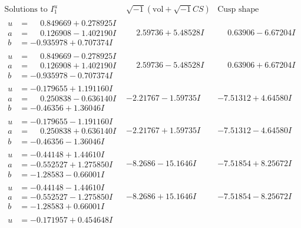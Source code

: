 \documentclass[1p]{elsarticle_modified}
\theoremstyle{definition}
\newcommand{\I}{\sqrt{-1}}
\begin{document}
$$\begin{array}{c|c|c}  
\text{Solutions to }I^u_{1}& \I (\text{vol} + \sqrt{-1}CS) & \text{Cusp shape}\\
 \hline 
\begin{aligned}
u &= \phantom{-}0.849669 + 0.278925 I \\
a &= \phantom{-}0.126908 - 1.402190 I \\
b &= -0.935978 + 0.707374 I\end{aligned}
 & \phantom{-}2.59736 + 5.48528 I & \phantom{-}0.63906 - 6.67204 I \\ \hline\begin{aligned}
u &= \phantom{-}0.849669 - 0.278925 I \\
a &= \phantom{-}0.126908 + 1.402190 I \\
b &= -0.935978 - 0.707374 I\end{aligned}
 & \phantom{-}2.59736 - 5.48528 I & \phantom{-}0.63906 + 6.67204 I \\ \hline\begin{aligned}
u &= -0.179655 + 1.191160 I \\
a &= \phantom{-}0.250838 - 0.636140 I \\
b &= -0.46356 + 1.36046 I\end{aligned}
 & -2.21767 - 1.59735 I & -7.51312 + 4.64580 I \\ \hline\begin{aligned}
u &= -0.179655 - 1.191160 I \\
a &= \phantom{-}0.250838 + 0.636140 I \\
b &= -0.46356 - 1.36046 I\end{aligned}
 & -2.21767 + 1.59735 I & -7.51312 - 4.64580 I \\ \hline\begin{aligned}
u &= -0.44148 + 1.44610 I \\
a &= -0.552527 + 1.275850 I \\
b &= -1.28583 - 0.66001 I\end{aligned}
 & -8.2686 - 15.1646 I & -7.51854 + 8.25672 I \\ \hline\begin{aligned}
u &= -0.44148 - 1.44610 I \\
a &= -0.552527 - 1.275850 I \\
b &= -1.28583 + 0.66001 I\end{aligned}
 & -8.2686 + 15.1646 I & -7.51854 - 8.25672 I \\ \hline\begin{aligned}
u &= -0.171957 + 0.454648 I \\

\end{aligned}
\end{array}$$
\end{document}

